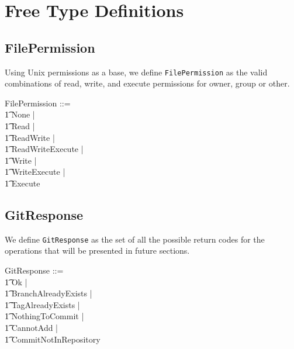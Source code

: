 \section{Free Type Definitions}

\subsection{FilePermission}

Using Unix permissions as a base, we define \texttt{FilePermission} as the valid
combinations of read, write, and execute permissions for owner, group or other.

\begin{zed}
  FilePermission ::= \\
  \t1 None | \\
  \t1 Read | \\
  \t1 ReadWrite | \\
  \t1 ReadWriteExecute | \\
  \t1 Write | \\
  \t1 WriteExecute | \\
  \t1 Execute
\end{zed}

\subsection{GitResponse}

We define \texttt{GitResponse} as the set of all the possible return codes
for the operations that will be presented in future sections.

\begin{zed}
  GitResponse ::= \\
  \t1 Ok | \\
  \t1 BranchAlreadyExists | \\
  \t1 TagAlreadyExists | \\
  \t1 NothingToCommit | \\
  \t1 CannotAdd | \\
  \t1 CommitNotInRepository
\end{zed}


